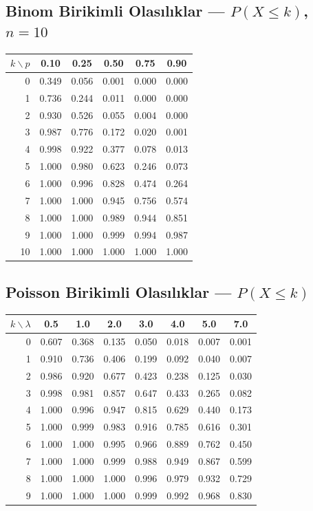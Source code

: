 \subsection{Binom Birikimli Olasılıklar — $P(X\leq k)$, $n=10$}

\begin{center}
\small
\renewcommand{\arraystretch}{1.1}
\begin{tabular}{r|ccccc}
\hline
$k \backslash p$ & 0.10 & 0.25 & 0.50 & 0.75 & 0.90 \\
\hline
0 & 0.349 & 0.056 & 0.001 & 0.000 & 0.000 \\
1 & 0.736 & 0.244 & 0.011 & 0.000 & 0.000 \\
2 & 0.930 & 0.526 & 0.055 & 0.004 & 0.000 \\
3 & 0.987 & 0.776 & 0.172 & 0.020 & 0.001 \\
4 & 0.998 & 0.922 & 0.377 & 0.078 & 0.013 \\
5 & 1.000 & 0.980 & 0.623 & 0.246 & 0.073 \\
6 & 1.000 & 0.996 & 0.828 & 0.474 & 0.264 \\
7 & 1.000 & 1.000 & 0.945 & 0.756 & 0.574 \\
8 & 1.000 & 1.000 & 0.989 & 0.944 & 0.851 \\
9 & 1.000 & 1.000 & 0.999 & 0.994 & 0.987 \\
10 & 1.000 & 1.000 & 1.000 & 1.000 & 1.000 \\
\hline
\end{tabular}
\end{center}

\subsection{Poisson Birikimli Olasılıklar — $P(X\leq k)$}

\begin{center}
\small
\renewcommand{\arraystretch}{1.1}
\begin{tabular}{r|ccccccc}
\hline
$k \backslash \lambda$ & 0.5 & 1.0 & 2.0 & 3.0 & 4.0 & 5.0 & 7.0 \\
\hline
0 & 0.607 & 0.368 & 0.135 & 0.050 & 0.018 & 0.007 & 0.001 \\
1 & 0.910 & 0.736 & 0.406 & 0.199 & 0.092 & 0.040 & 0.007 \\
2 & 0.986 & 0.920 & 0.677 & 0.423 & 0.238 & 0.125 & 0.030 \\
3 & 0.998 & 0.981 & 0.857 & 0.647 & 0.433 & 0.265 & 0.082 \\
4 & 1.000 & 0.996 & 0.947 & 0.815 & 0.629 & 0.440 & 0.173 \\
5 & 1.000 & 0.999 & 0.983 & 0.916 & 0.785 & 0.616 & 0.301 \\
6 & 1.000 & 1.000 & 0.995 & 0.966 & 0.889 & 0.762 & 0.450 \\
7 & 1.000 & 1.000 & 0.999 & 0.988 & 0.949 & 0.867 & 0.599 \\
8 & 1.000 & 1.000 & 1.000 & 0.996 & 0.979 & 0.932 & 0.729 \\
9 & 1.000 & 1.000 & 1.000 & 0.999 & 0.992 & 0.968 & 0.830 \\
\hline
\end{tabular}
\end{center}
